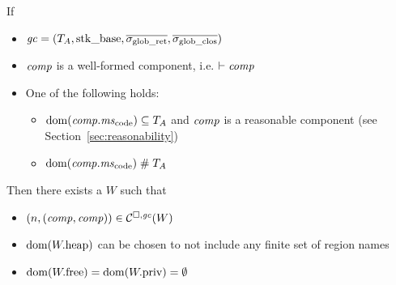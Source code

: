 \documentclass[a4paper]{article}
\begin{document}
\begin{lemma}
  \label{lem:ftlr-comps}
  If
  \begin{itemize}
  \item $\mathit{gc} = (T_{A},\mathrm{stk\_base},\overline{\sigma_{\mathrm{glob\_ret}}},\overline{\sigma_{\mathrm{glob\_clos}}})$
  \item $\mathit{comp}$ is a well-formed component, i.e. $\vdash \mathit{comp}$
  \item One of the following holds:
    \begin{itemize}
    \item $\dom(\var{comp}.\mscode) \subseteq \ta$ and $\mathit{comp}$ is a reasonable component (see Section~\ref{sec:reasonability})
    \item $\dom(\var{comp}.\mscode) \mathrel{\#} \ta$
    \end{itemize}
  \end{itemize}
  Then there exists a $W$ such that
  \begin{itemize}
  \item $\left(n,(\mathit{comp},\mathit{comp})\right) \in \mathcal{C}^{\square,\mathit{gc}}(W)$
  \item $\mathrm{dom}(W.\mathrm{heap})$ can be chosen to not include any finite set of region names 
  \item $\mathrm{dom}(W.\mathrm{free}) =
    \mathrm{dom}(W.\mathrm{priv})=\emptyset$
  \end{itemize}
\end{lemma}
\end{document}
